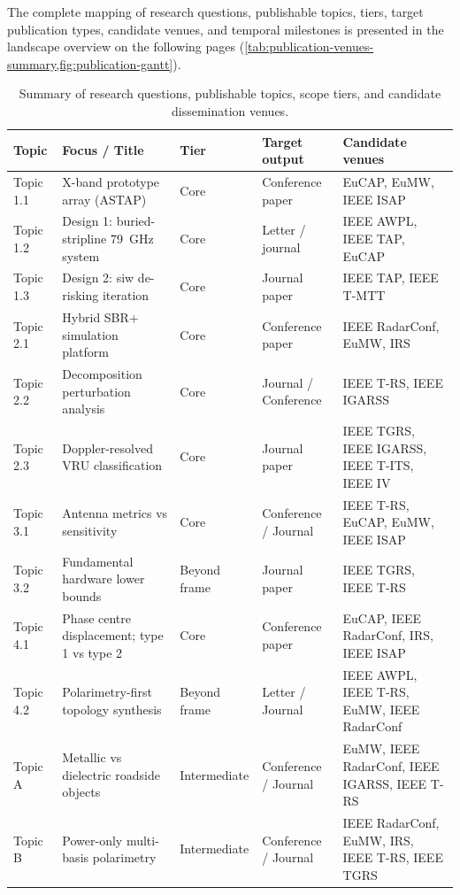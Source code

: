 The complete mapping of research questions, publishable topics, tiers, target publication types, candidate venues, and temporal milestones is presented in the landscape overview on the following pages (\cref{tab:publication-venues-summary,fig:publication-gantt}).

\begin{landscape}
\begin{table}[!p]
    \centering
    \caption{Summary of research questions, publishable topics, scope tiers, and candidate dissemination venues.}
    \label{tab:publication-venues-summary}
    \small
    \begin{tabularx}{\linewidth}{lXllX}
        \toprule
        \textbf{Topic} & \textbf{Focus / Title} & \textbf{Tier} & \textbf{Target output} & \textbf{Candidate venues} \\
        \midrule
        Topic 1.1 & X-band prototype array (ASTAP) & Core & Conference paper & EuCAP, EuMW, IEEE ISAP \\
        Topic 1.2 & Design 1: buried-stripline \qty{79}{GHz} system & Core & Letter / journal & IEEE AWPL, IEEE TAP, EuCAP \\
        Topic 1.3 & Design 2: \gls{siw} de-risking iteration & Core & Journal paper & IEEE TAP, IEEE T-MTT \\
        \midrule
        Topic 2.1 & Hybrid SBR+ simulation platform & Core & Conference paper & IEEE RadarConf, EuMW, IRS \\
        Topic 2.2 & Decomposition perturbation analysis & Core & Journal / Conference & IEEE T-RS, IEEE IGARSS \\
        Topic 2.3 & Doppler-resolved VRU classification & Core & Journal paper & IEEE TGRS, IEEE IGARSS, IEEE T-ITS, IEEE IV \\
        \midrule
        Topic 3.1 & Antenna metrics vs sensitivity & Core & Conference / Journal & IEEE T-RS, EuCAP, EuMW, IEEE ISAP \\
        Topic 3.2 & Fundamental hardware lower bounds & Beyond frame & Journal paper & IEEE TGRS, IEEE T-RS \\
        \midrule
        Topic 4.1 & Phase centre displacement; type 1 vs type 2 & Core & Conference paper & EuCAP, IEEE RadarConf, IRS, IEEE ISAP \\
        Topic 4.2 & Polarimetry-first topology synthesis & Beyond frame & Letter / Journal & IEEE AWPL, IEEE T-RS, EuMW, IEEE RadarConf \\
        \midrule
        Topic A & Metallic vs dielectric roadside objects & Intermediate & Conference / Journal & EuMW, IEEE RadarConf, IEEE IGARSS, IEEE T-RS \\
        Topic B & Power-only multi-basis polarimetry & Intermediate & Conference / Journal & IEEE RadarConf, EuMW, IRS, IEEE T-RS, IEEE TGRS \\
        \bottomrule
    \end{tabularx}
\end{table}


\end{landscape}
